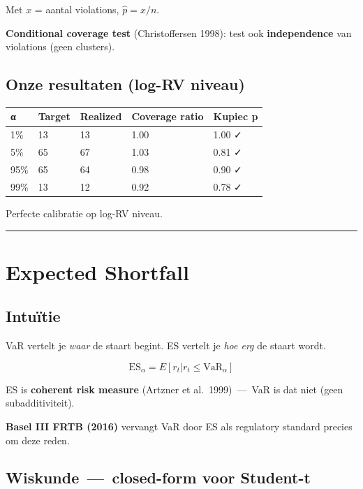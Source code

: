 Met \(x\) = aantal violations, \(\hat p = x/n\).

\textbf{Conditional coverage test} (Christoffersen 1998): test ook \textbf{independence} van violations (geen clusters).

\hypertarget{onze-resultaten-log-rv-niveau}{%
\subsection{Onze resultaten (log-RV niveau)}\label{onze-resultaten-log-rv-niveau}}

\begin{longtable}[]{@{}lllll@{}}
\toprule
α & Target & Realized & Coverage ratio & Kupiec p \\
\midrule
\endhead
1\% & 13 & 13 & 1.00 & 1.00 ✓ \\
5\% & 65 & 67 & 1.03 & 0.81 ✓ \\
95\% & 65 & 64 & 0.98 & 0.90 ✓ \\
99\% & 13 & 12 & 0.92 & 0.78 ✓ \\
\bottomrule
\end{longtable}

Perfecte calibratie op log-RV niveau.

\begin{center}\rule{0.5\linewidth}{0.5pt}\end{center}

\hypertarget{expected-shortfall}{%
\section{Expected Shortfall}\label{expected-shortfall}}

\hypertarget{intuuxeftie-10}{%
\subsection{Intuïtie}\label{intuuxeftie-10}}

VaR vertelt je \emph{waar} de staart begint. ES vertelt je \emph{hoe erg} de staart wordt.

\[\text{ES}_\alpha = E[r_t | r_t \leq \text{VaR}_\alpha]\]

ES is \textbf{coherent risk measure} (Artzner et al.~1999) \,---\, VaR is dat niet (geen subadditiviteit).

\textbf{Basel III FRTB (2016)} vervangt VaR door ES als regulatory standard precies om deze reden.

\hypertarget{wiskunde-closed-form-voor-student-t}{%
\subsection{Wiskunde \,---\, closed-form voor Student-t}\label{wiskunde-closed-form-voor-student-t}}


